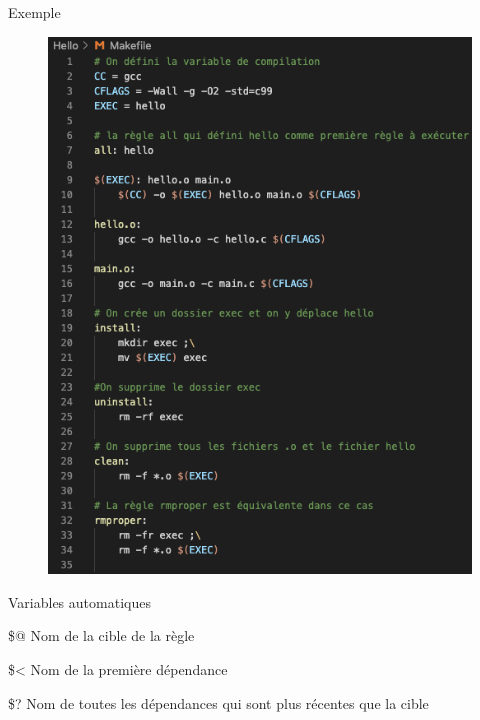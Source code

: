 \documentclass[10pt,xcolor=dvipsnames]{beamer}
\begin{document}
\begin{frame}{Exemple}
    \begin{figure}
        \centering
        \includegraphics[scale=0.35]{figures/makefile_variable_2.png}
        \label{fig:my_label}
    \end{figure}
\end{frame}

\begin{frame}{Variables automatiques}
    \begin{exampleblock}{\$@}
    Nom de la cible de la règle
    \end{exampleblock}
    \begin{exampleblock}{\$<}
    Nom de la première dépendance
    \end{exampleblock}
    
    \begin{exampleblock}{\$?}
    Nom de toutes les dépendances qui sont plus récentes que la cible
    \end{exampleblock}
\end{frame}
\end{document}
